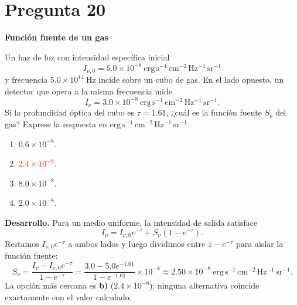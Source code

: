 \documentclass[a4paper,11pt]{article}
\newcommand{\pregunta}[2]{\section*{Pregunta #1}\textbf{#2}\par}
\begin{document}
\pregunta{20}{Función fuente de un gas}

Un haz de luz con intensidad específica inicial
\[
I_{\nu,0}=5.0\times10^{-8}\ \mathrm{erg\,s^{-1}\,cm^{-2}\,Hz^{-1}\,sr^{-1}}
\]
y frecuencia $5.0\times10^{14}\ \mathrm{Hz}$ incide sobre un cubo de gas. En el lado opuesto, un detector que opera a la misma frecuencia mide
\[
I_{\nu}=3.0\times10^{-8}\ \mathrm{erg\,s^{-1}\,cm^{-2}\,Hz^{-1}\,sr^{-1}}.
\]
Si la profundidad óptica del cubo es $\tau=1.61$, ¿cuál es la función fuente $S_{\nu}$ del gas? Exprese la respuesta en $\mathrm{erg\,s^{-1}\,cm^{-2}\,Hz^{-1}\,sr^{-1}}$.

\begin{enumerate}
    \item $0.6\times10^{-8}$.
    \item \textcolor{red}{$2.4\times10^{-8}$.}
    \item $8.0\times10^{-8}$.
    \item $2.0\times10^{-8}$.
\end{enumerate}



\textbf{Desarrollo.} Para un medio uniforme, la intensidad de salida satisface
\[
I_\nu=I_{\nu,0}e^{-\tau}+S_\nu(1-e^{-\tau}).
\]
Restamos $I_{\nu,0}e^{-\tau}$ a ambos lados y luego dividimos entre $1-e^{-\tau}$ para aislar la función fuente:
\[
S_\nu=\frac{I_\nu-I_{\nu,0}e^{-\tau}}{1-e^{-\tau}}
=\frac{3.0-5.0e^{-1.61}}{1-e^{-1.61}}\times10^{-8}\approx2.50\times10^{-8}\ \mathrm{erg\,s^{-1}\,cm^{-2}\,Hz^{-1}\,sr^{-1}}.
\]
La opción más cercana es \textbf{b)} ($2.4\times10^{-8}$); ninguna alternativa coincide exactamente con el valor calculado. \parencite[Sec. 13.7, pp. 403--405]{chaparro2026}

\printbibliography[title={Referencia}]
\end{document}
